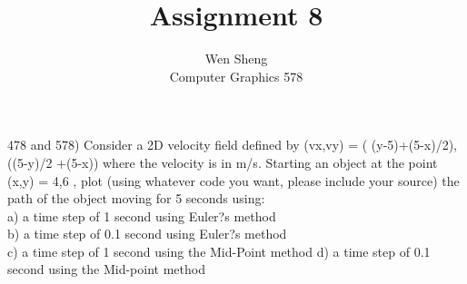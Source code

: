 \documentclass[12pt]{article}
\newenvironment{exercise}[2][Exercise]{\begin{trivlist}
\item[\hskip \labelsep {\bfseries #1}\hskip \labelsep {\bfseries #2.}]}{\end{trivlist}}
\begin{document}
 
 
 
\title{ Assignment 8}%
\author{Wen Sheng\\ %
Computer Graphics 578 } %
 
\maketitle
 
\begin{exercise}{2} %
 (478 and 578) Consider a 2D velocity field defined by
(vx,vy) = ( (y-5)+(5-x)/2), ((5-y)/2 +(5-x)) where the velocity is in m/s.
Starting an object at the point (x,y) = 4,6 , plot (using whatever code you want, please include your source) the path of the object moving for 5 seconds using:\\
 a) a time step of 1 second using Euler?s method\\
b) a time step of 0.1 second using Euler?s method\\
c) a time step of 1 second using the Mid-Point method d) a time step of 0.1 second using the Mid-point method\\
\end{exercise}
 
\end{document}
